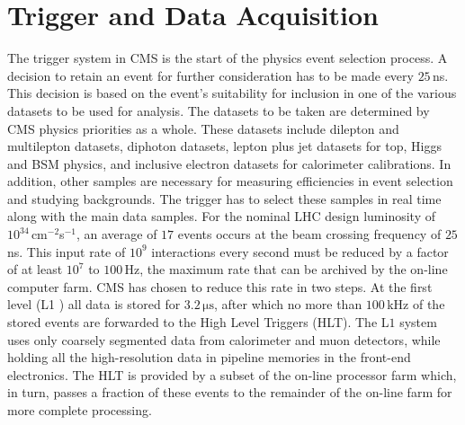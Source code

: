 \section{Trigger and Data Acquisition}\label{sec:trig}
The trigger system in CMS is the start of the physics event selection process. A decision to retain an event for further consideration has to be made every $25 \,$ns. This decision is based on the event's suitability for inclusion in one of the various datasets to be used for analysis. The datasets to be taken are determined by CMS physics priorities as a whole. These datasets include dilepton and multilepton datasets, diphoton datasets, lepton plus jet datasets for top, Higgs and BSM physics, and inclusive electron datasets for calorimeter calibrations. In addition, other samples are necessary for measuring efficiencies in event selection and studying backgrounds. The trigger has to select these samples in real time along with the main data samples.
For the nominal LHC design luminosity of $10^{34} \,$cm$^{-2}$s$^{-1}$, an average of $17$ events occurs at the beam crossing frequency of $25$ ns. This input rate of $10^9$ interactions every second must be reduced by a factor of at least $10^7$ to $100 \,$Hz, the maximum rate that can be archived by the on-line computer farm. CMS has chosen to reduce
this rate in two steps. At the first level (L1 \cite{L1}) all data is stored for $3.2 \, \mathrm{\mu s}$, after which no more than $100 $\,kHz of the stored events are forwarded to the High Level Triggers (HLT). The L$1$ system uses only coarsely segmented data from calorimeter and muon detectors, while holding all the high-resolution data in pipeline memories in the front-end electronics. The HLT \cite{HLT} is provided by a subset of the on-line processor farm which, in turn, passes a fraction of these events to the remainder of the on-line farm for more complete processing.

